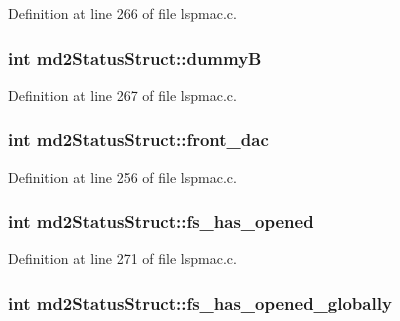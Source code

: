 Definition at line 266 of file lspmac.c.\hypertarget{structmd2StatusStruct_aab597be69a8dcc140778d9aeb8a50eee}{
\subsubsection[{dummyB}]{\setlength{\rightskip}{0pt plus 5cm}int {\bf md2StatusStruct::dummyB}}}
\label{structmd2StatusStruct_aab597be69a8dcc140778d9aeb8a50eee}


Definition at line 267 of file lspmac.c.\hypertarget{structmd2StatusStruct_a3be73c48b09190241a2bcb801af5b97c}{
\subsubsection[{front\_\-dac}]{\setlength{\rightskip}{0pt plus 5cm}int {\bf md2StatusStruct::front\_\-dac}}}
\label{structmd2StatusStruct_a3be73c48b09190241a2bcb801af5b97c}


Definition at line 256 of file lspmac.c.\hypertarget{structmd2StatusStruct_ab961c2ba24a1a8c95a88dec25319e712}{
\subsubsection[{fs\_\-has\_\-opened}]{\setlength{\rightskip}{0pt plus 5cm}int {\bf md2StatusStruct::fs\_\-has\_\-opened}}}
\label{structmd2StatusStruct_ab961c2ba24a1a8c95a88dec25319e712}


Definition at line 271 of file lspmac.c.\hypertarget{structmd2StatusStruct_ac95696b7ed35ccfdfb6aeeee879bdb65}{
\subsubsection[{fs\_\-has\_\-opened\_\-globally}]{\setlength{\rightskip}{0pt plus 5cm}int {\bf md2StatusStruct::fs\_\-has\_\-opened\_\-globally}}}
\label{structmd2StatusStruct_ac95696b7ed35ccfdfb6aeeee879bdb65}


